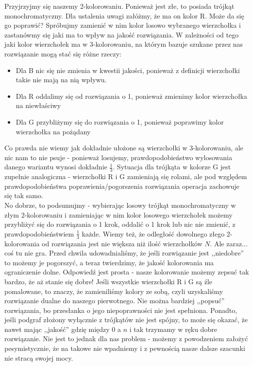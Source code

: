 \documentclass[a4paper,11pt]{article}
\begin{document}
Przyjrzyjmy się naszemy 2-kolorowaniu. Ponieważ jest złe, to posiada trójkąt
monochromatyczny. Dla ustalenia uwagi załóżmy, że ma on kolor R.
Może da się go poprawić? Spróbujmy zamienić w nim kolor losowo
wybranego wierzchołka i zastanówmy się jaki ma to wpływ na jakość rozwiązania.
W zależności od tego jaki kolor wierzchołek ma w 3-kolorowaniu, na którym bazuje
szukane przez nas rozwiązanie mogą stać się różne rzeczy:
\begin{itemize}
  \item{Dla B nic się nie zmienia w kwestii jakości, ponieważ z definicji
        wierzchołki takie nie mają na nią wpływu.}
  \item{Dla R oddalimy się od rozwiązania o 1, ponieważ zmienimy kolor
        wierzchołka na niewłaściwy}
  \item{Dla G przybliżymy się do rozwiązania o 1, ponieważ poprawimy kolor
        wierzchołka na pożądany}
\end{itemize}
Co prawda nie wiemy jak dokładnie ułożone są wierzchołki w 3-kolorowaniu, ale
nic nam to nie psuje - ponieważ losujemy, prawdopodobieństwo wylosowania danego
wariantu wynosi dokładnie $\frac{1}{3}$. Sytuacja dla trójkąta w kolorze G jest
zupełnie analogiczna - wierzchołki R i G zamieniają się rolami, ale pod względem
prawdopodobieństwa poprawienia/pogorszenia rozwiązania operacja zachowuje się
tak samo. \\


No dobrze, to podsumujmy - wybierając losowy trójkąt monochromatyczny w złym
2-kolorowaniu i zamieniając w nim kolor losowego wierzchołek możemy przybliżyć
się do rozwiązania o 1 krok, oddalić o 1 krok lub nic nie zmienić, z
prawdopodobieństwiem $\frac{1}{3}$ każde. Wiemy też, że odległość dowolnego
złego 2-kolorowania od rozwiązania jest nie większa niż ilość wierzchołków $N$.
Ale zaraz... coś tu nie gra. Przed chwila udowadnialiśmy, że jeśli rozwiązanie
jest ,,niedobre'' to możemy je pogorszyć, a teraz twierdzimy, że jakość
kolorowania ma ograniczenie dolne. Odpowiedź jest prosta - nasze kolorowanie
możemy zepsuć tak bardzo, że aż stanie się dobre! Jeśli wszystkie wierzchołki R
i G są źle pomalowane, to znaczy, że zamieniliśmy kolory ze sobą, czyli
uzyskaliśmy rozwiązanie dualne do naszego pierwotnego. Nie można bardziej
,,popsuć'' rozwiązania, bo przesłanka o jego niepoprawności nie jest spełniona.
Ponadto, jeśli podgraf złożony wyłącznie z trójkątów nie jest spójny, to może
się okazać, że nawet mając ,,jakość'' gdzię między $0$ a $n$ i tak trzymamy w
ręku dobre rozwiązanie. Nie jest to jednak dla nas problem - możemy z
powodzeniem założyć pesymistycznie, że na takowe nie wpadniemy i z pewnością nasze
dalsze szacunki nie stracą swojej mocy. \\
\end{document}
